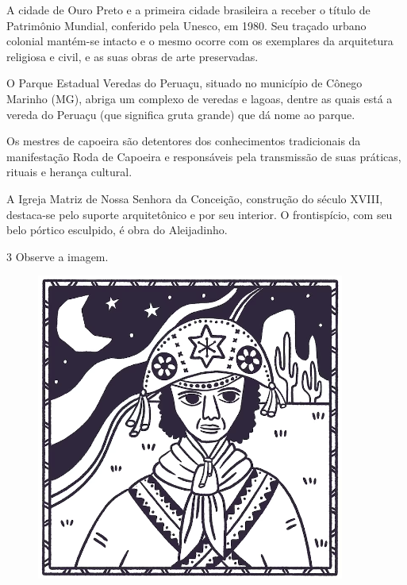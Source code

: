 \begin{escolha}
\item
  A cidade de Ouro Preto e a primeira cidade brasileira a receber o
  título de Patrimônio Mundial, conferido pela Unesco, em 1980. Seu
  traçado urbano colonial mantém-se intacto e o mesmo ocorre com os
  exemplares da arquitetura religiosa e civil, e as suas obras de arte
  preservadas.
\item
  O Parque Estadual Veredas do Peruaçu, situado no município de Cônego
  Marinho (MG), abriga um complexo de veredas e lagoas, dentre as quais
  está a vereda do Peruaçu (que significa gruta grande) que dá nome ao
  parque.
\item
  Os mestres de capoeira são detentores dos conhecimentos tradicionais
  da manifestação Roda de Capoeira e responsáveis pela transmissão de
  suas práticas, rituais e herança cultural.
\item
  A Igreja Matriz de Nossa Senhora da Conceição, construção do século
  XVIII, destaca-se pelo suporte arquitetônico e por seu interior. O
  frontispício, com seu belo pórtico esculpido, é obra do Aleijadinho.
\end{escolha}



\num{3}  Observe a imagem.

\begin{figure}[htpb!]
\includegraphics[width=\textwidth]{./imgs/art43.png}
\end{figure}

